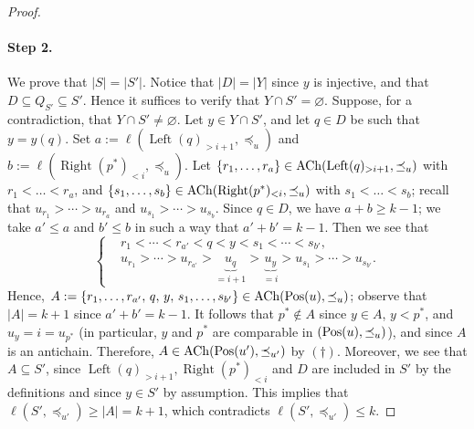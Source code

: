\documentclass[reqno]{amsart}
\theoremstyle{definition}
\theoremstyle{remark}
\numberwithin{equation}{section}
\begin{document}
\begin{proof}
		\paragraph{\bf Step 2.} We prove that $|S|=|S'|$.
		Notice that $|D|=|Y|$ since $y$ is injective,
		and that $D\subseteq Q_{S'}\subseteq S'$.
		Hence it suffices to verify that
		$Y\cap S'=\varnothing$.
		Suppose, for a contradiction, that
		$Y\cap S'\ne\varnothing$.
		Let $y\in Y\cap S'$, 
		and let $q\in D$ be such that $y=y(q)$.
		Set $a:=\ell(\operatorname{Left}(q)_{>i+1},\preceq_u)$ and $b:=\ell(\operatorname{Right}(p^\ast)_{<i},\preceq_u).$
		Let $\{r_1,\dots,r_a\}\in\operatorname{ACh}(\operatorname{Left}(q)_{>i+1},\preceq_u)$ with $r_1<\dots<r_a$,
		and
		$\{s_1,\dots,s_b\}\in\operatorname{ACh}(\operatorname{Right}(p^\ast)_{<i},\preceq_u)$ with $s_1<\dots<s_b$;
		recall that $u_{r_1}>\cdots>u_{r_a}$ and $u_{s_1}>\cdots>u_{s_b}$.
		Since $q\in D$, we have $a+b\ge k-1$;
		we take $a'\le a$ and $b'\le b$ in such a way that $a'+b'=k-1$.
		Then we see that
		\[
		\left\{\begin{aligned}
			&r_{1}<\cdots<r_{a'}<q<y<s_1<\cdots<s_{b'},\\
			&u_{r_{1}}>\cdots>u_{r_{a'}}>\underset{=i+1}{\underbrace{u_q}}>\underset{=i}{\underbrace{u_y}}>u_{s_1}>\cdots>u_{s_{b'}}.\end{aligned}\right.
		\]
		Hence, $A:=\{r_{1},\dots,r_{a'},\,q,\,y,\,s_1,\dots,s_{b'}\}\in\operatorname{ACh}(\operatorname{Pos}(u),\preceq_u)$;
		observe that $|A|=k+1$ since $a'+b'=k-1$.
		It follows that $p^\ast\notin A$ since $y\in A$, $y<p^\ast$, and $u_y=i=u_{p^\ast}$ (in particular,
		$y$ and $p^\ast$ are comparable in $(\operatorname{Pos}(u),\preceq_u)$), 
		and since
		$A$ is an antichain.
		Therefore, $A\in\operatorname{ACh}(\operatorname{Pos}(u'),\preceq_{u'})$
		by $(\dagger)$.
		Moreover, we see that $A\subseteq S'$,
		since $\operatorname{Left}(q)_{>i+1},\operatorname{Right}(p^\ast)_{<i}$ and $D$ are included in $S'$ by the definitions and since $y\in S'$ by assumption.
		This implies that $\ell(S',\preceq_{u'})\ge|A|=k+1$, which contradicts $\ell(S',\preceq_{u'})\le k$.

\end{proof}
\end{document}
